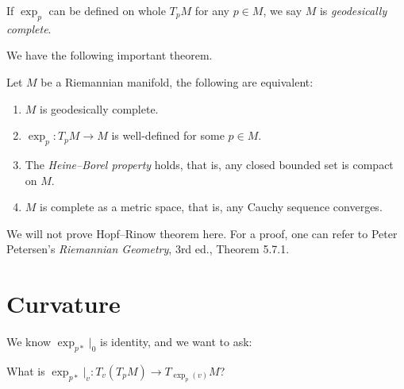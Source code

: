 \begin{defn}\label{geodesically completeness}
    If $\exp_p$ can be defined on whole $T_pM$ for any $p\in M$, we say $M$ is \emph{geodesically complete}.
\end{defn}

We have the following important theorem.

\begin{thm}
    Let $M$ be a Riemannian manifold, the following are equivalent:
    \begin{enumerate}[(1)]
        \item $M$ is geodesically complete.
        \item $\exp_p:T_pM\to M$ is well-defined for some $p\in M$.
        \item The \emph{Heine--Borel property} holds, that is, any closed bounded set is compact on $M$.
        \item $M$ is complete as a metric space, that is, any Cauchy sequence converges.
    \end{enumerate}
\end{thm}

We will not prove Hopf--Rinow theorem here.
For a proof, one can refer to Peter Petersen's \emph{Riemannian Geometry}, 3rd ed., Theorem 5.7.1.

\section{Curvature}\label{sect of curv}

We know $\exp_{p*}|_0$ is identity, and we want to ask:
\begin{ques}
    What is $\exp_{p*}|_v:T_v(T_pM)\to T_{\exp_{p}(v)}M$?
\end{ques}

